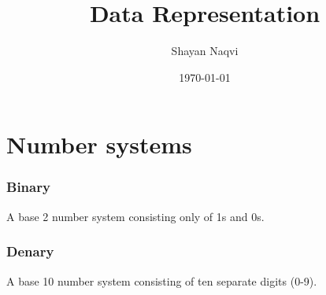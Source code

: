 \documentclass[11pt]{article}
\author{Shayan Naqvi}
\date{\today}
\title{Data Representation}
\begin{document}
\maketitle
\tableofcontents

\section{Number systems}
\label{sec:orgdb3c167}
\subsubsection{Binary}
\label{sec:orge7a352b}
A base 2 number system consisting only of 1s and 0s.
\subsubsection{Denary}
\label{sec:orge2f174e}
A base 10 number system consisting of ten separate digits (0-9).
\end{document}
